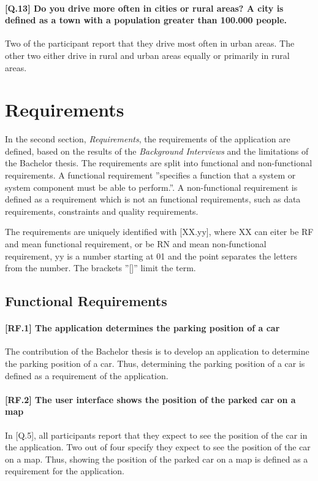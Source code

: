\paragraph{[Q.13] Do you drive more often in cities or rural areas? A city is defined as a town with a population greater than 100.000 people.}
Two of the participant report that they drive most often in urban areas. The other two either drive in rural and urban areas equally or primarily in rural areas.


\section{Requirements}
In the second section, \textit{Requirements}, the requirements of the application are defined, based on the results of the \textit{Background Interviews} and the limitations of the Bachelor thesis. The requirements are split into functional and non-functional requirements. A functional requirement ''specifies a function that a system or system component must be able to perform.''. A non-functional requirement is defined as a requirement which is not an functional requirements, such as data requirements, constraints and quality requirements. \cite{eide2005quantification}

The requirements are uniquely identified with [XX.yy], where XX can eiter be RF and mean functional requirement, or be RN and mean non-functional requirement, yy is a number starting at 01 and the point separates the letters from the number. The brackets ''[]'' limit the term.  

\subsection{Functional Requirements}

\paragraph{[RF.1] The application determines the parking position of a car}
The contribution of the Bachelor thesis is to develop an application to determine the parking position of a car. Thus, determining the parking position of a car is defined as a requirement of the application.

\paragraph{[RF.2] The user interface shows the position of the parked car on a map}
In [Q.5], all participants report that they expect to see the position of the car in the application. Two out of four specify they expect to see the position of the car on a map. Thus, showing the position of the parked car on a map is defined as a requirement for the application. 

